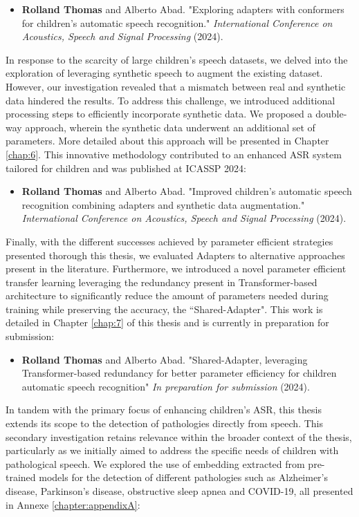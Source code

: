 \begin{itemize}
    \item \textbf{Rolland Thomas} and Alberto Abad. "Exploring adapters with conformers for children’s automatic speech recognition." \textit{ International Conference on Acoustics, Speech and Signal Processing} (2024).
\end{itemize}

In response to the scarcity of large children's speech datasets, we delved into the exploration of leveraging synthetic speech to augment the existing dataset. However, our investigation revealed that a mismatch between real and synthetic data hindered the results. To address this challenge, we introduced additional processing steps to efficiently incorporate synthetic data. We proposed a double-way approach, wherein the synthetic data underwent an additional set of parameters. More detailed about this approach will be presented in Chapter \ref{chap:6}. This innovative methodology contributed to an enhanced \ac{ASR} system tailored for children and was published at ICASSP 2024:

\begin{itemize}
    \item \textbf{Rolland Thomas} and Alberto Abad. "Improved children’s automatic speech recognition combining adapters and synthetic data augmentation." \textit{International Conference on Acoustics, Speech and Signal Processing} (2024).
\end{itemize}

Finally, with the different successes achieved by parameter efficient strategies presented thorough this thesis, we evaluated Adapters to alternative approaches present in the literature. Furthermore, we introduced a novel parameter efficient transfer learning leveraging the redundancy present in Transformer-based architecture to significantly reduce the amount of parameters needed during training while preserving the accuracy, the ``Shared-Adapter". This work is detailed in Chapter \ref{chap:7} of this thesis and is currently in preparation for submission:
\begin{itemize}
    \item \textbf{Rolland Thomas} and Alberto Abad. "Shared-Adapter, leveraging Transformer-based redundancy for better parameter efficiency for children automatic speech recognition" \textit{In preparation for submission} (2024).
\end{itemize}

In tandem with the primary focus of enhancing children's \ac{ASR}, this thesis extends its scope to the detection of pathologies directly from speech. This secondary investigation retains relevance within the broader context of the thesis, particularly as we initially aimed to address the specific needs of children with pathological speech. We explored the use of embedding extracted from pre-trained models for the detection of different pathologies such as Alzheimer's disease, Parkinson's disease, obstructive sleep apnea and COVID-19, all presented in Annexe \ref{chapter:appendixA}:

